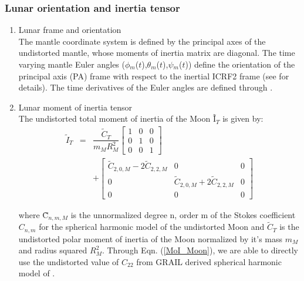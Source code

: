 \documentclass[fleqn,usenatbib,referee]{mnras}
\begin{document}
\subsubsection{Lunar orientation and inertia tensor}
\begin{enumerate}
\item Lunar frame and orientation\\The mantle coordinate system is defined by the principal axes of the undistorted mantle, whose moments of inertia matrix are diagonal. The time varying mantle Euler angles ($\phi$$_m$($t$),$\theta$$_m$($t$),$\psi$$_m$($t$)) define the orientation of the principal axis (PA) frame with respect to the inertial ICRF2 frame (see \cite{Folkner2014} for details). The time derivatives of the Euler angles are defined through \citet[Eqn. 14]{Folkner2014}.

      \item Lunar moment of inertia tensor \\
      The undistorted total moment of inertia of the Moon \~{I}$_T$ is given by:
      \begin{eqnarray}\label{MoI_Moon}
        \tilde{I}_T &=&  \dfrac{\tilde{C}_T}{m_{M}R^{2}_{M}}\begin{bmatrix}
                                                         1 &0 &0 \\
                                                         0 &1 &0 \\
                                                         0 &0 &1\end{bmatrix}\nonumber \\
                                                         &&+
          \begin{bmatrix}
                  \tilde{C}_{2,0,M} - 2\tilde{C}_{2,2,M}      &0                                          &0    \\
                  0                                           &\tilde{C}_{2,0,M} + 2\tilde{C}_{2,2,M}     &0    \\
                  0                                           &0                                          &0
          \end{bmatrix}
      \end{eqnarray}

      where \~{C}$_{n,m,M}$ is the unnormalized degree n, order m of the Stokes coefficient $C_{n,m}$ for the spherical harmonic model of the undistorted Moon and $\tilde{C}_T$ is the undistorted polar moment of inertia of the Moon normalized by it's mass $m_M$ and radius squared $R^{2}_M$. Through Eqn. (\ref{MoI_Moon}), we are able to directly use the undistorted value of $C_{22}$ \cite[]{Manche2011} from GRAIL derived spherical harmonic model of \cite{Konopliv2013}.


\end{enumerate}
\end{document}
